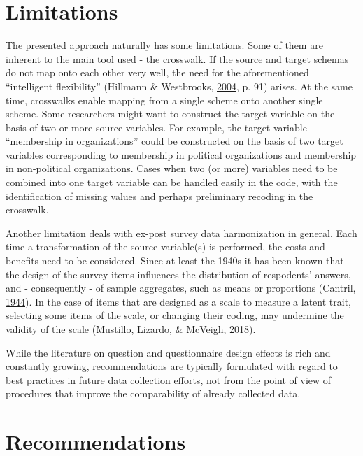 \documentclass[12pt,]{article}
\begin{document}
\hypertarget{limitations}{%
\section{Limitations}\label{limitations}}

The presented approach naturally has some limitations. Some of them are inherent to the main tool used - the crosswalk. If the source and target schemas do not map onto each other very well, the need for the aforementioned ``intelligent flexibility'' (Hillmann \& Westbrooks, \protect\hyperlink{ref-Hillmann2004}{2004}, p. 91) arises. At the same time, crosswalks enable mapping from a single scheme onto another single scheme. Some researchers might want to construct the target variable on the basis of two or more source variables. For example, the target variable ``membership in organizations'' could be constructed on the basis of two target variables corresponding to membership in political organizations and membership in non-political organizations. Cases when two (or more) variables need to be combined into one target variable can be handled easily in the code, with the identification of missing values and perhaps preliminary recoding in the crosswalk.

Another limitation deals with ex-post survey data harmonization in general. Each time a transformation of the source variable(s) is performed, the costs and benefits need to be considered. Since at least the 1940s it has been known that the design of the survey items influences the distribution of respodents' answers, and - consequently - of sample aggregates, such as means or proportions (Cantril, \protect\hyperlink{ref-Cantril1944}{1944}). In the case of items that are designed as a scale to measure a latent trait, selecting some items of the scale, or changing their coding, may undermine the validity of the scale (Mustillo, Lizardo, \& McVeigh, \protect\hyperlink{ref-Mustillo2018}{2018}).

While the literature on question and questionnaire design effects is rich and constantly growing, recommendations are typically formulated with regard to best practices in future data collection efforts, not from the point of view of procedures that improve the comparability of already collected data.

\hypertarget{recommendations}{%
\section{Recommendations}\label{recommendations}}
\end{document}
